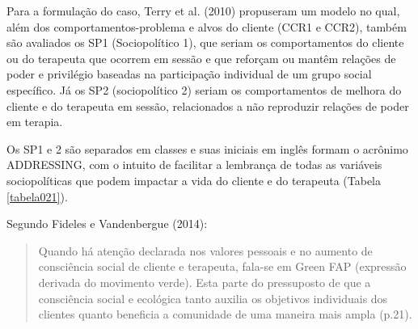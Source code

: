 Para a formulação do caso, Terry et al. (2010) propuseram um modelo no qual, além dos comportamentos-problema e alvos do cliente (CCR1 e CCR2), também são avaliados os SP1 (Sociopolítico 1), que seriam os comportamentos do cliente ou do terapeuta que ocorrem em sessão e que reforçam ou mantêm relações de poder e privilégio baseadas na participação individual de um grupo social específico. Já os SP2 (sociopolítico 2) seriam os comportamentos de melhora do cliente e do terapeuta em sessão, relacionados a não reproduzir relações de poder em terapia.

Os SP1 e 2 são separados em classes e suas iniciais em inglês formam o acrônimo ADDRESSING, com o intuito de facilitar a lembrança de todas as variáveis sociopolíticas que podem impactar a vida do cliente e do terapeuta (Tabela \ref{tabela021}).

Segundo Fideles e Vandenbergue (2014):

\begin{quote}
    Quando há atenção declarada nos valores pessoais e no aumento de consciência social de cliente e terapeuta, fala-se em Green FAP (expressão derivada do movimento verde). Esta parte do pressuposto de que a consciência social e ecológica tanto auxilia os objetivos individuais dos clientes quanto beneficia a comunidade de uma maneira mais ampla (p.21).
\end{quote}


